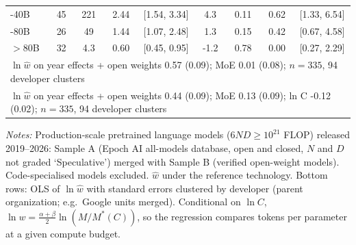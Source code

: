 \begin{table}[htbp]
\begin{threeparttable}
\begin{tabular}{@{}lcccccccc@{}}
\quad 16-40B & 45 & 221 & 2.44 & [1.54, 3.34] & 4.3 & 0.11 & 0.62 & [1.33, 6.54] \\
\quad 40-80B & 26 & 49 & 1.44 & [1.07, 2.48] & 1.3 & 0.15 & 0.42 & [0.67, 4.58] \\
\quad $>$80B & 32 & 4.3 & 0.60 & [0.45, 0.95] & -1.2 & 0.78 & 0.00 & [0.27, 2.29] \\
\multicolumn{9}{l}{\footnotesize $\ln\hat w$ on year effects + open weights 0.57 (0.09); MoE 0.01 (0.08); $n=335$, 94 developer clusters} \\
\multicolumn{9}{l}{\footnotesize $\ln\hat w$ on year effects + open weights 0.44 (0.09); MoE 0.13 (0.09); ln C -0.12 (0.02); $n=335$, 94 developer clusters} \\
\bottomrule
\end{tabular}
\begin{tablenotes}\footnotesize
\item \textit{Notes:} Production-scale pretrained language models ($6ND\ge10^{21}$ FLOP) released 2019--2026: Sample A (Epoch AI all-models database, open and closed, $N$ and $D$ not graded `Speculative') merged with Sample B (verified open-weight models). Code-specialised models excluded. $\hat w$ under the reference technology. Bottom rows: OLS of $\ln\hat w$ with standard errors clustered by developer (parent organization; e.g.\ Google units merged). Conditional on $\ln C$, $\ln w=\tfrac{\alpha+\beta}{2}\ln(M/M^*(C))$, so the regression compares tokens per parameter at a given compute budget.
\end{tablenotes}
\end{threeparttable}
\end{table}

